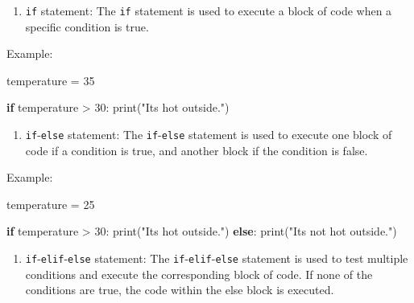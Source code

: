 \documentclass[
  paper=a4,
  ,captions=tableheading
]{scrartcl}
\newenvironment{Shaded}{}{}
\newcommand{\BuiltInTok}[1]{\textcolor[rgb]{0.00,0.50,0.00}{#1}}
\newcommand{\ControlFlowTok}[1]{\textcolor[rgb]{0.00,0.44,0.13}{\textbf{#1}}}
\newcommand{\DecValTok}[1]{\textcolor[rgb]{0.25,0.63,0.44}{#1}}
\newcommand{\NormalTok}[1]{#1}
\newcommand{\OperatorTok}[1]{\textcolor[rgb]{0.40,0.40,0.40}{#1}}
\newcommand{\StringTok}[1]{\textcolor[rgb]{0.25,0.44,0.63}{#1}}
\providecommand{\tightlist}{%
  \setlength{\itemsep}{0pt}\setlength{\parskip}{0pt}}
\begin{document}
\begin{enumerate}
\def\labelenumi{\arabic{enumi}.}
\tightlist
\item
  \texttt{if} statement: The \texttt{if} statement is used to execute a
  block of code when a specific condition is true.
\end{enumerate}

Example:

\begin{Shaded}
\begin{Highlighting}[]
\NormalTok{temperature }\OperatorTok{=} \DecValTok{35}

\ControlFlowTok{if}\NormalTok{ temperature }\OperatorTok{\textgreater{}} \DecValTok{30}\NormalTok{:}
    \BuiltInTok{print}\NormalTok{(}\StringTok{"It\textquotesingle{}s hot outside."}\NormalTok{)}
\end{Highlighting}
\end{Shaded}

\begin{enumerate}
\def\labelenumi{\arabic{enumi}.}
\setcounter{enumi}{1}
\tightlist
\item
  \texttt{if}-\texttt{else} statement: The \texttt{if}-\texttt{else}
  statement is used to execute one block of code if a condition is true,
  and another block if the condition is false.
\end{enumerate}

Example:

\begin{Shaded}
\begin{Highlighting}[]
\NormalTok{temperature }\OperatorTok{=} \DecValTok{25}

\ControlFlowTok{if}\NormalTok{ temperature }\OperatorTok{\textgreater{}} \DecValTok{30}\NormalTok{:}
    \BuiltInTok{print}\NormalTok{(}\StringTok{"It\textquotesingle{}s hot outside."}\NormalTok{)}
\ControlFlowTok{else}\NormalTok{:}
    \BuiltInTok{print}\NormalTok{(}\StringTok{"It\textquotesingle{}s not hot outside."}\NormalTok{)}
\end{Highlighting}
\end{Shaded}

\begin{enumerate}
\def\labelenumi{\arabic{enumi}.}
\setcounter{enumi}{2}
\tightlist
\item
  \texttt{if}-\texttt{elif}-\texttt{else} statement: The
  \texttt{if}-\texttt{elif}-\texttt{else} statement is used to test
  multiple conditions and execute the corresponding block of code. If
  none of the conditions are true, the code within the else block is
  executed.
\end{enumerate}
\end{document}
